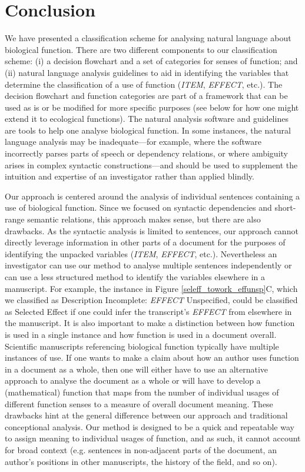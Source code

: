 \documentclass{article}
\begin{document}
\section{Conclusion}
\label{sec:conclusion}

We have presented a classification scheme for analysing natural language about biological function.
There are two different components to our classification scheme: (i) a decision flowchart and a set of categories for senses of function; and (ii) natural language analysis guidelines to aid in identifying the variables that determine the classification of a use of function (\emph{ITEM}, \emph{EFFECT}, etc.).
The decision flowchart and function categories are part of a framework that can be used as is or be modified for more specific purposes (see below for how one might extend it to ecological functions).
The natural analysis software and guidelines are tools to help one analyse biological function.
In some instances, the natural language analysis may be inadequate---for example, where the software incorrectly parses parts of speech or dependency relations, or where ambiguity arises in complex syntactic constructions---and should be used to supplement the intuition and expertise of an investigator rather than applied blindly.

Our approach is centered around the analysis of individual sentences containing a use of biological function.
Since we focused on syntactic dependencies and short-range semantic relations, this approach makes sense, but there are also drawbacks.
As the syntactic analysis is limited to sentences, our approach cannot directly leverage information in other parts of a document for the purposes of identifying the unpacked variables (\emph{ITEM}, \emph{EFFECT}, etc.).
Nevertheless an investigator can use our method to analyse multiple sentences independently or can use a less structured method to identify the variables elsewhere in a manuscript.
For example, the instance in Figure \ref{seleff_towork_effunsp}C, which we classified as Description Incomplete: \emph{EFFECT} Unspecified, could be classified as Selected Effect if one could infer the transcript's \emph{EFFECT} from elsewhere in the manuscript.
It is also important to make a distinction between how function is used in a single instance and how function is used in a document overall.
Scientific manuscripts referencing biological function typically have multiple instances of use.
If one wants to make a claim about how an author uses function in a document as a whole, then one will either have to use an alternative approach to analyse the document as a whole or will have to develop a (mathematical) function that maps from the number of individual usages of different function senses to a measure of overall document meaning.
These drawbacks hint at the general difference between our approach and traditional conceptional analysis.
Our method is designed to be a quick and repeatable way to assign meaning to individual usages of function, and as such, it cannot account for broad context (e.g. sentences in non-adjacent parts of the document, an author's positions in other manuscripts, the history of the field, and so on).
\end{document}
